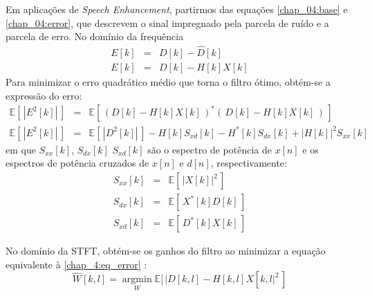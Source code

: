 Em aplicações de \textit{Speech Enhancement}, partirmos das equações
\ref{chap_04:base} e \ref{chap_04:error}, que descrevem o sinal impregnado pela
parcela de ruído e a parcela de erro. No domínio da frequência
\begin{eqnarray}
    E[k] &=& D[k] - \hat{D}[k] \\
    E[k] &=& D[k] - H[k]X[k] \label{chap_4:eq_error}
\end{eqnarray}
Para minimizar o erro quadrático médio que torna o filtro ótimo, obtém-se a expressão do erro:
\begin{eqnarray}
    \mathbb{E}\left[\,|E^2[k]|\,\right] &=& \mathbb{E}\left[\,\left(D[k]-H[k]X[k]\,\right)^\ast \left(\,D[k]-H[k]X[k]\,\right)\,\right] \\
    \mathbb{E}\left[\,|E^2[k]|\,\right] &=& \mathbb{E}\left[\,|D^2[k]|\,\right] - H[k]S_{xd}[k] - H^\ast[k]S_{dx}[k] + |H[k]|^2S_{xx}[k]
\end{eqnarray}
em que $S_{xx}[k]$, $S_{dx}[k]$ $S_{xd}[k]$ são o espectro de potência de $x[n]$ e os espectros
de potência cruzados de $x[n]$ e $d[n]$, respectivamente:
\begin{eqnarray}
    S_{xx}[k] &=& \mathbb{E}\left[\,|X[k]|^2  \,\right] \\
    S_{dx}[k] &=& \mathbb{E}\left[\,X^*[k]D[k]\,\right] \\
    S_{xd}[k] &=& \mathbb{E}\left[\,D^*[k]X[k]\,\right]
\end{eqnarray}

No domínio da STFT, obtém-se os ganhos do filtro ao minimizar a equação equivalente à \eqref{chap_4:eq_error} \cite{parchami2016}:
\begin{equation}
    \hat{W}[k, l] = \operatorname*{argmin}_W \mathbb{E}[\,|D[k,l] - H[k,l]X[k,l|^2\,]
\end{equation}




